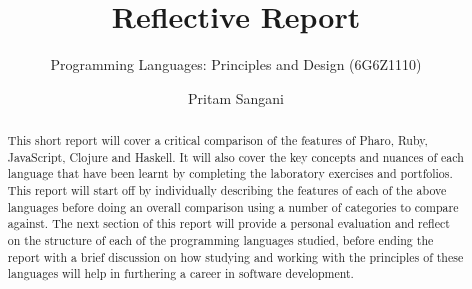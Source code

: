 \documentclass[a4paper,12pt, abstract=true]{scrartcl}
\title{Reflective Report}
\subtitle{Programming Languages: Principles and Design (6G6Z1110)}
\author{Pritam Sangani}
\begin{document}
\maketitle

\begin{abstract}
\noindent This short report will cover a critical comparison of the features of Pharo, Ruby, JavaScript, Clojure and Haskell. It will also cover the key concepts and nuances of each language that have been learnt by completing the laboratory exercises and portfolios. This report will start off by individually describing the features of each of the above languages before doing an overall comparison using a number of categories to compare against. The next section of this report will provide a personal evaluation and reflect on the structure of each of the programming languages studied, before ending the report with a brief discussion on how studying and working with the principles of these languages will help in furthering a career in software development.
\end{abstract}




\end{document}
